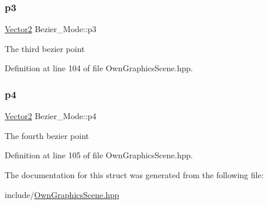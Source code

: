 \subsubsection{\texorpdfstring{p3}{p3}}
{\footnotesize\ttfamily \mbox{\hyperlink{classVector2}{Vector2}} Bezier\+\_\+\+Mode\+::p3}

The third bezier point 

Definition at line 104 of file Own\+Graphics\+Scene.\+hpp.

\mbox{\label{structBezier__Mode_a5a3df46137ba62eaf3f9c0ad1ee391ef}} 
\subsubsection{\texorpdfstring{p4}{p4}}
{\footnotesize\ttfamily \mbox{\hyperlink{classVector2}{Vector2}} Bezier\+\_\+\+Mode\+::p4}

The fourth bezier point 

Definition at line 105 of file Own\+Graphics\+Scene.\+hpp.



The documentation for this struct was generated from the following file\+:\begin{DoxyCompactItemize}
\item 
include/\mbox{\hyperlink{OwnGraphicsScene_8hpp}{Own\+Graphics\+Scene.\+hpp}}\end{DoxyCompactItemize}
